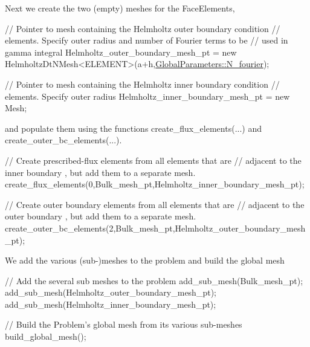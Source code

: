 Next we create the two (empty) meshes for the {\ttfamily Face\+Elements},

 
\begin{DoxyCodeInclude}
 \textcolor{comment}{// Pointer to mesh containing the Helmholtz outer boundary condition}
 \textcolor{comment}{// elements. Specify outer radius and number of Fourier terms to be}
 \textcolor{comment}{// used in gamma integral}
 Helmholtz\_outer\_boundary\_mesh\_pt = 
  \textcolor{keyword}{new} HelmholtzDtNMesh<ELEMENT>(a+h,\hyperlink{namespaceGlobalParameters_ae4df03bf0ffa55b741ac846ca7b6c155}{GlobalParameters::N\_fourier});
 
 \textcolor{comment}{// Pointer to mesh containing the Helmholtz inner boundary condition}
 \textcolor{comment}{// elements. Specify outer radius}
 Helmholtz\_inner\_boundary\_mesh\_pt = \textcolor{keyword}{new} Mesh;

\end{DoxyCodeInclude}


and populate them using the functions {\ttfamily create\+\_\+flux\+\_\+elements}(...) and {\ttfamily create\+\_\+outer\+\_\+bc\+\_\+elements}(...).

 
\begin{DoxyCodeInclude}
 \textcolor{comment}{// Create prescribed-flux elements from all elements that are }
 \textcolor{comment}{// adjacent to the inner boundary , but add them to a separate mesh.}
 create\_flux\_elements(0,Bulk\_mesh\_pt,Helmholtz\_inner\_boundary\_mesh\_pt);

 \textcolor{comment}{// Create outer boundary elements from all elements that are }
 \textcolor{comment}{// adjacent to the outer boundary , but add them to a separate mesh.}
 create\_outer\_bc\_elements(2,Bulk\_mesh\_pt,Helmholtz\_outer\_boundary\_mesh\_pt);

\end{DoxyCodeInclude}


We add the various (sub-\/)meshes to the problem and build the global mesh

 
\begin{DoxyCodeInclude}
 \textcolor{comment}{// Add the several  sub meshes to the problem}
 add\_sub\_mesh(Bulk\_mesh\_pt);
 add\_sub\_mesh(Helmholtz\_outer\_boundary\_mesh\_pt); 
 add\_sub\_mesh(Helmholtz\_inner\_boundary\_mesh\_pt);   
  
 \textcolor{comment}{// Build the Problem's global mesh from its various sub-meshes}
 build\_global\_mesh();

\end{DoxyCodeInclude}


